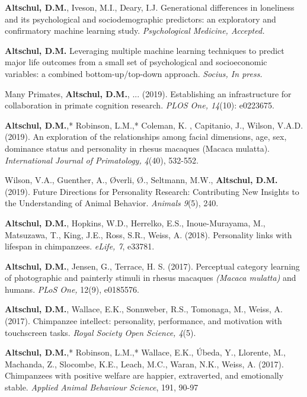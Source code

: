 \documentclass[margin,line]{res}
\begin{document}
{\bf Altschul, D.M.}, Iveson, M.I., Deary, I.J. Generational differences in loneliness and its psychological and sociodemographic predictors: an exploratory and confirmatory machine learning study. {\it Psychological Medicine, Accepted.}

{\bf Altschul, D.M.}  Leveraging multiple machine learning techniques to predict major life outcomes from a small set of psychological and socioeconomic variables: a combined bottom-up/top-down approach. {\it Socius, In press.}

Many Primates, {\bf Altschul, D.M.}, ... (2019). Establishing an infrastructure for collaboration in primate cognition research. {\it PLOS One, 14}(10): e0223675.

{\bf Altschul, D.M.},* Robinson, L.M.,* Coleman, K. , Capitanio, J., Wilson, V.A.D. (2019). An exploration of the relationships among facial dimensions, age, sex, dominance
status and personality in rhesus macaques (Macaca mulatta). {\it International Journal of Primatology, 4}(40), 532-552.

Wilson, V.A., Guenther, A., Øverli, Ø., Seltmann, M.W., {\bf Altschul, D.M.} (2019). Future Directions for Personality Research: Contributing New Insights to the Understanding of Animal Behavior. {\it Animals 9}(5), 240.

{\bf Altschul, D.M.}, Hopkins, W.D., Herrelko, E.S., Inoue-Murayama, M., Matsuzawa, T., King, J.E., Ross, S.R., Weiss, A. (2018). Personality links with lifespan in chimpanzees. {\it eLife, 7}, e33781.

{\bf Altschul, D.M.}, Jensen, G.,  Terrace, H. S. (2017). Perceptual category learning of photographic and painterly stimuli in rhesus macaques {\it (Macaca mulatta)} and humans.  {\it PLoS One,} 12(9), e0185576.

{\bf Altschul, D.M.}, Wallace, E.K., Sonnweber, R.S., Tomonaga, M., Weiss, A. (2017). Chimpanzee intellect: personality, performance, and motivation with touchscreen tasks. {\it Royal Society Open Science, 4}(5).

{\bf Altschul, D.M.},* Robinson, L.M.,* Wallace, E.K., \'{U}beda, Y., Llorente, M., Machanda, Z., Slocombe, K.E., Leach, M.C., Waran, N.K., Weiss, A. (2017). Chimpanzees with positive welfare are happier, extraverted, and emotionally stable. {\it Applied Animal Behaviour Science}, 191, 90-97

\end{document}
